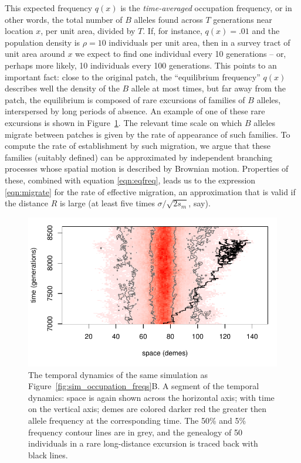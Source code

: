 \documentclass{article}
\begin{document}
This expected frequency $q(x)$ is the \emph{time-averaged} occupation frequency,
or in other words, the total number of $B$ alleles found across $T$ generations near location $x$, per unit area, divided by $T$.
If, for instance, $q(x)=.01$ and the population density is $\rho=10$ individuals per unit area, 
then in a survey tract of unit area around $x$ we expect to find one individual every 10 generations
-- or, perhaps more likely, 10 individuals every 100 generations.
This points to an important fact: 
close to the original patch, the ``equilibrium frequency'' $q(x)$ describes well the density of the $B$ allele at most times,
but far away from the patch, 
the equilibrium is composed of rare excursions of families of $B$
alleles, interspersed by long periods of absence. 
An example of one of these rare excursions is shown in Figure~\ref{fig:sim_snapshots}.
The relevant time scale on which $B$ alleles migrate between patches is given by the rate of appearance of such families.
To compute the rate of establishment by such migration,
we argue that these families (suitably defined) can be approximated by
independent branching processes whose spatial motion is described by Brownian motion.
Properties of these, combined with equation \eqref{eqn:eqfreq},
leads us to the expression \eqref{eqn:migrate} for the rate of effective migration,
an approximation that is valid if the distance $R$ is large (at least five times $\sigma/\sqrt{2s_m}$, say).

\begin{figure}[ht!]
  \begin{center}
    \includegraphics{sim-snapshots}
  \end{center}
  \caption{
  The temporal dynamics of the same simulation as Figure~\ref{fig:sim_occupation_freqs}B.
  A segment of the temporal dynamics: space is again shown across the horizontal axis;
  with time on the vertical axis; demes are colored darker red the greater then allele frequency at the corresponding time.
  The 50\% and 5\% frequency contour lines are in grey,
  and the genealogy of 50 individuals in a rare long-distance excursion is traced back with black lines.
  }   \label{fig:sim_snapshots}
\end{figure}
\end{document}
